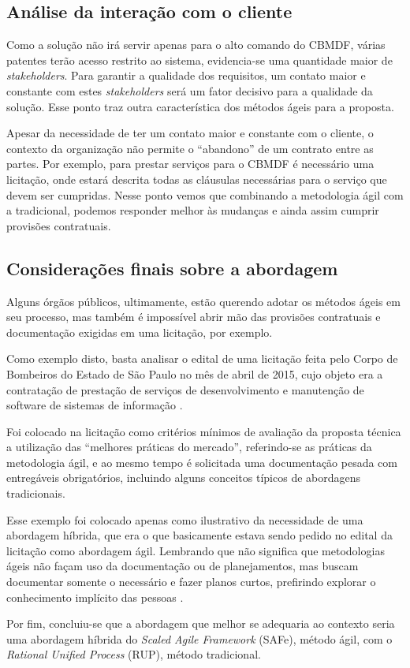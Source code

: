 	
    \subsection{Análise da interação com o cliente}
	
	Como a solução não irá servir apenas para o alto comando do CBMDF, várias patentes terão acesso restrito ao sistema,
	evidencia-se uma quantidade maior de \textit{stakeholders}. Para garantir a qualidade dos requisitos, um contato maior e
	constante com estes \textit{stakeholders} será um fator decisivo para a qualidade da solução. Esse ponto traz outra
	característica dos métodos ágeis para a proposta.
	
	Apesar da necessidade de ter um contato maior e constante com o cliente, o contexto da organização não permite
	o “abandono” de um contrato entre as partes. Por exemplo, para prestar serviços para o CBMDF é necessário uma
	licitação, onde estará descrita todas as cláusulas necessárias para o serviço que devem ser cumpridas. Nesse 
	ponto vemos que combinando a metodologia ágil com a tradicional, podemos responder melhor às mudanças e ainda
	assim cumprir provisões contratuais.
    
    \subsection{Considerações finais sobre a abordagem}
	
	Alguns órgãos públicos, ultimamente, estão querendo adotar os métodos ágeis em seu processo, mas também é impossível
	abrir mão das provisões contratuais e documentação exigidas em uma licitação, por exemplo.
	
	Como exemplo disto, basta analisar o edital de uma licitação feita pelo Corpo de Bombeiros do Estado de São Paulo
	no mês de abril de 2015, cujo objeto era a contratação de prestação de serviços de desenvolvimento e manutenção de
	software de sistemas de informação \cite{brasil15}.
	
	Foi colocado na licitação como critérios mínimos de avaliação da proposta técnica a utilização das
	“melhores práticas do mercado”, referindo-se as práticas da metodologia ágil, e ao mesmo tempo é solicitada
	uma documentação pesada com entregáveis obrigatórios, incluindo alguns conceitos típicos de abordagens tradicionais.
	
	Esse exemplo foi colocado apenas como ilustrativo da necessidade de uma abordagem híbrida, que era o que basicamente
	estava sendo pedido no edital da licitação como abordagem ágil. Lembrando que não significa que metodologias ágeis
	não façam uso da documentação ou de planejamentos, mas buscam documentar somente o necessário e fazer planos curtos,
	prefirindo explorar o conhecimento implícito das pessoas \cite{boehm}.
	
	Por fim, concluiu-se que a abordagem que melhor se adequaria ao contexto seria uma abordagem híbrida do
	\textit{Scaled Agile Framework} (SAFe), método ágil, com o \textit{Rational Unified Process} (RUP), método tradicional.